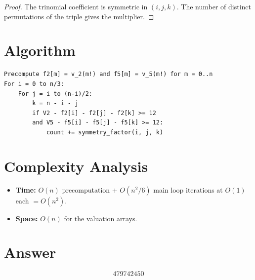 \documentclass[12pt]{article}
\begin{document}
\begin{proof}
The trinomial coefficient is symmetric in $(i,j,k)$. The number of distinct permutations of the triple gives the multiplier.
\end{proof}

\section{Algorithm}

\begin{verbatim}
Precompute f2[m] = v_2(m!) and f5[m] = v_5(m!) for m = 0..n
For i = 0 to n/3:
    For j = i to (n-i)/2:
        k = n - i - j
        if V2 - f2[i] - f2[j] - f2[k] >= 12
        and V5 - f5[i] - f5[j] - f5[k] >= 12:
            count += symmetry_factor(i, j, k)
\end{verbatim}

\section{Complexity Analysis}

\begin{itemize}
    \item \textbf{Time:} $O(n)$ precomputation $+$ $O(n^2/6)$ main loop iterations at $O(1)$ each $= O(n^2)$.
    \item \textbf{Space:} $O(n)$ for the valuation arrays.
\end{itemize}

\section{Answer}

\[
\boxed{479742450}
\]
\end{document}
